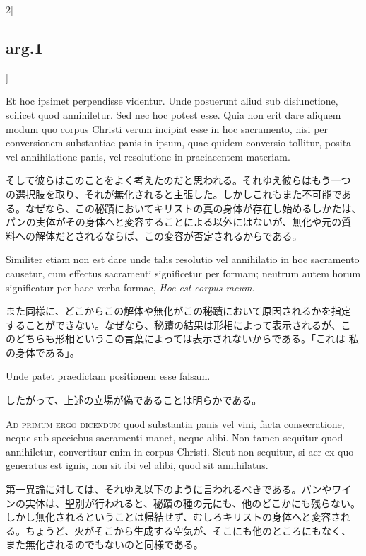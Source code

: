 \documentclass[paper=a4paper,fontsize=10pt,jafontsize=9pt,titlepage]{jlreq}
\begin{document}
\begin{paracol}{2}[\subsection{arg.1}]
\switchcolumn*

Et hoc ipsimet perpendisse videntur. Unde posuerunt aliud sub
disiunctione, scilicet quod annihiletur. Sed nec hoc potest esse. Quia
non erit dare aliquem modum quo corpus Christi verum incipiat esse in
hoc sacramento, nisi per conversionem substantiae panis in ipsum, quae
quidem conversio tollitur, posita vel annihilatione panis, vel
resolutione in praeiacentem materiam.

\switchcolumn

そして彼らはこのことをよく考えたのだと思われる。それゆえ彼らはもう一つ
の選択肢を取り、それが無化されると主張した。しかしこれもまた不可能であ
る。なぜなら、この秘蹟においてキリストの真の身体が存在し始めるしかたは、
パンの実体がその身体へと変容することによる以外にはないが、無化や元の質
料への解体だとされるならば、この変容が否定されるからである。

\switchcolumn*

Similiter etiam non est dare unde talis resolutio vel annihilatio in
hoc sacramento causetur, cum effectus sacramenti significetur per
formam; neutrum autem horum significatur per haec verba formae,
{\itshape Hoc est corpus meum}.

\switchcolumn

また同様に、どこからこの解体や無化がこの秘蹟において原因されるかを指定
することができない。なぜなら、秘蹟の結果は形相によって表示されるが、こ
のどちらも形相というこの言葉によっては表示されないからである。「これは
私の身体である」。

\switchcolumn*

Unde patet praedictam positionem esse falsam.

\switchcolumn

したがって、上述の立場が偽であることは明らかである。

\switchcolumn*[\subsection{ad.1}]

{\scshape Ad primum ergo dicendum} quod substantia panis vel vini,
facta consecratione, neque sub speciebus sacramenti manet, neque
alibi. Non tamen sequitur quod annihiletur, convertitur enim in corpus
Christi. Sicut non sequitur, si aer ex quo generatus est ignis, non
sit ibi vel alibi, quod sit annihilatus.

\switchcolumn

第一異論に対しては、それゆえ以下のように言われるべきである。パンやワイ
ンの実体は、聖別が行われると、秘蹟の種の元にも、他のどこかにも残らない。
しかし無化されるということは帰結せず、むしろキリストの身体へと変容され
る。ちょうど、火がそこから生成する空気が、そこにも他のところにもなく、
また無化されるのでもないのと同様である。


\end{paracol}
\end{document}
